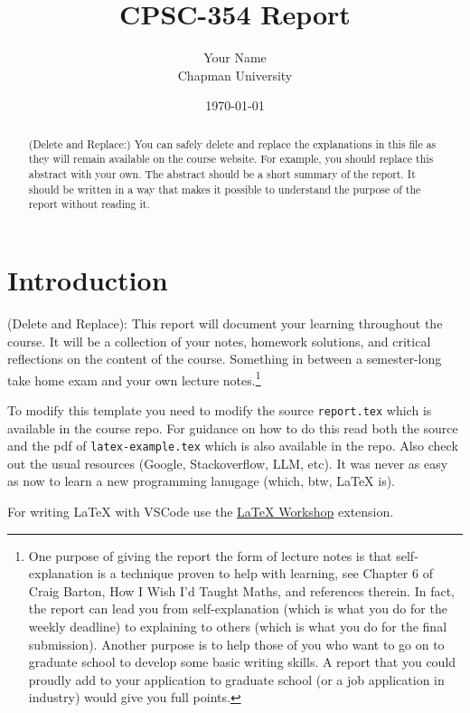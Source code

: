 \documentclass{article}
\title{CPSC-354 Report}
\author{Your Name  \\ Chapman University}
\date{\today}
\theoremstyle{theorem}
\theoremstyle{definition}
\theoremstyle{remark}
\begin{document}
\maketitle

\begin{abstract}
(Delete and Replace:) You can safely delete and replace the explanations in this file as they will remain available on the course website. For example, you should replace this abstract with your own. The abstract should be a short summary of the report. It should be written in a way that makes it possible to understand the purpose of the report without reading it.  
\end{abstract}

\setcounter{tocdepth}{3}
\tableofcontents

\section{Introduction}\label{intro}

(Delete and Replace): This report will document your learning throughout the course. It will be a collection of your notes, homework solutions, and critical reflections on the content of the course. Something in between a semester-long take home exam and your own lecture notes.\footnote{One purpose of giving the report the form of lecture notes is that self-explanation is a technique proven to help with learning, see Chapter 6 of Craig Barton, How I Wish I'd Taught Maths, and references therein. In fact, the report can lead you from self-explanation (which is what you do for the weekly deadline) to explaining to others (which is what you do for the final submission). Another purpose is to help those of you who want to go on to graduate school to develop some basic writing skills. A report that you could proudly add to your application to graduate school (or a job application in industry) would give you full points.}

To modify this template you need to modify the source \texttt{report.tex} which is available in the course repo. For guidance on how to do this read both the source and the pdf of \texttt{latex-example.tex} which is also available in the repo. Also check out the usual resources (Google, Stackoverflow, LLM, etc). It was never as easy as now to learn a new programming lanugage (which, btw, \LaTeX{} is).

For writing \LaTeX{} with VSCode use the \href{https://marketplace.visualstudio.com/items?itemName=James-Yu.latex-workshop}{LaTeX Workshop} extension. 
\end{document}
